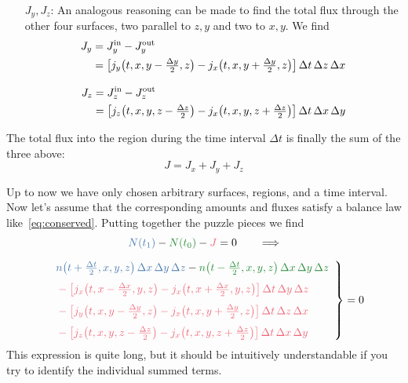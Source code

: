 \documentclass[a4paper,12pt,%
onecolumn,oneside,titlepage,%
british%
]{memoir}
\newcommand*{\incr}{\Delta}%
\renewcommand*{\|}[1][]{\nonscript\:#1\vert\nonscript\:\mathopen{}}
\newcommand*{\yti}{t_{0}}
\newcommand*{\ytf}{t_{1}}
\newcommand*{\Dt}{\incr t}
\newcommand*{\Dx}{\incr x}
\newcommand*{\Dy}{\incr y}
\newcommand*{\Dz}{\incr z}
\newcommand*{\Dth}{\tfrac{\incr t}{2}}
\newcommand*{\Dxh}{\tfrac{\incr x}{2}}
\newcommand*{\Dyh}{\tfrac{\incr y}{2}}
\newcommand*{\Dzh}{\tfrac{\incr z}{2}}
\newcommand*{\yN}{N}
\newcommand*{\yJ}{J}
\begin{document}
\begin{itemize}
\begin{itemize}
  \item[$\yJ_{y}, \yJ_{z}$:] An analogous reasoning can be made to find the total flux through the other four surfaces, two parallel to $z,y$ and two to $x,y$. We find
    \begin{align}
      \label{neq:Fyflux}
      \begin{split}
        \yJ_{y} &= \yJ_{y}^{\text{in}} - \yJ_{y}^{\text{out}}
        \\&= \bigl[ j_{y}\bigl(t, x, y-\Dyh, z\bigr) - j_{x}\bigl(t, x, y+\Dyh, z\bigr)\bigr]
        \,\Dt\,\Dz\,\Dx
      \end{split}
      \\[3\jot]
      \label{neq:Fzflux}
      \begin{split}
        \yJ_{z} &= \yJ_{z}^{\text{in}} - \yJ_{z}^{\text{out}}
        \\&= \bigl[ j_{z}\bigl(t, x, y, z-\Dzh\bigr) - j_{x}\bigl(t, x, y, z+\Dzh\bigr)\bigr]
        \,\Dt\,\Dx\,\Dy
      \end{split}
    \end{align}
  \end{itemize}
The total flux into the region during the time interval $\Dt$ is finally the sum of the three above:
\begin{equation}
  \label{neq:Fflux}
  \yJ = \yJ_{x} + \yJ_{y} + \yJ_{z}
\end{equation}
\end{itemize}

Up to now we have only chosen arbitrary surfaces, regions, and a time interval. Now let's assume that the corresponding amounts and fluxes satisfy a balance law like~\eqref{eq:conserved}. Putting together the puzzle pieces we find
\begin{multline*}
  \label{neq:balance_pieces}
    \mathcolor{blue}{\yN(\ytf)} -\mathcolor{green}{\yN(\yti)} - \mathcolor{red}{\yJ} = 0 \qquad     \Longrightarrow
    \\[2\jot]
    \left.\begin{aligned}
      &\mathcolor{blue}{n\bigl(t+\Dth, x,y,z\bigr)\,\Dx\,\Dy\,\Dz}
      - \mathcolor{green}{n\bigl(t-\Dth, x,y,z\bigr)\,\Dx\,\Dy\,\Dz}
      \\[\jot]\quad&\color{red}-\bigl[ j_{x}\bigl(t, x-\Dxh, y, z\bigr) - j_{x}\bigl(t, x+\Dxh, y, z\bigr)\bigr]
      \,\Dt\,\Dy\,\Dz
      \\[\jot]\quad&\color{red}-\bigl[ j_{y}\bigl(t, x, y-\Dyh, z\bigr) - j_{x}\bigl(t, x, y+\Dyh, z\bigr)\bigr]
      \,\Dt\,\Dz\,\Dx
      \\[\jot]\quad&\color{red}-\bigl[ j_{z}\bigl(t, x, y, z-\Dzh\bigr) - j_{x}\bigl(t, x, y, z+\Dzh\bigr)\bigr]
      \,\Dt\,\Dx\,\Dy
    \end{aligned}\enspace\right\}=0
\end{multline*}
This expression is quite long, but it should be intuitively understandable if you try to identify the individual summed terms.
\end{document}
